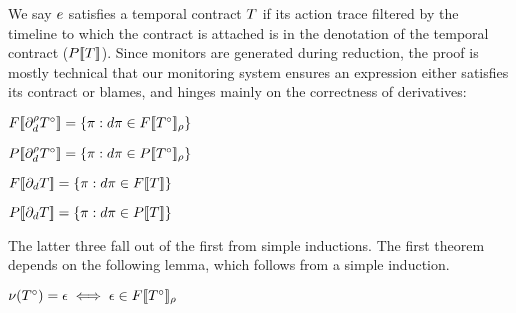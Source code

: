 We say $e$ satisfies a temporal contract $T$ if its action trace filtered by the timeline to which the contract is attached is in the denotation of the temporal contract ($P[\![ T ]\!]$).
%
Since monitors are generated during reduction, the proof is mostly technical that our monitoring system ensures an expression either satisfies its contract or blames, and hinges mainly on the correctness of derivatives:
%

\begin{theorem}[Full]\label{thm:full}
 $F[\![ \partial_{d}^{\rho}{T^\circ} ]\!] = \left\{\pi : d\pi \in F[\![ T^\circ ]\!]_{\rho}\right\}$
\end{theorem}

\begin{theorem}[Partial]\label{thm:partial}
 $P[\![ \partial_{d}^{\rho}{T^\circ} ]\!] = \left\{\pi : d\pi \in P[\![ T^\circ ]\!]_{\rho}\right\}$
\end{theorem}

\begin{theorem}\label{thm:top-full}
 $F[\![ \partial_{d}{T} ]\!] = \left\{\pi : d\pi \in F[\![ T ]\!]\right\}$
\end{theorem}

\begin{theorem}\label{thm:top-partial}
 $P[\![ \partial_{d}{T} ]\!] = \left\{\pi : d\pi \in P[\![ T ]\!]\right\}$
\end{theorem}

The latter three fall out of the first from simple inductions.
%
The first theorem depends on the following lemma, which follows from a simple induction.

\begin{lemma}[Nullability]\label{lem:nullability}
  $\nu(T^\circ) = \epsilon \iff \epsilon \in F[\![ T^\circ ]\!]_{\rho}$
\end{lemma}

